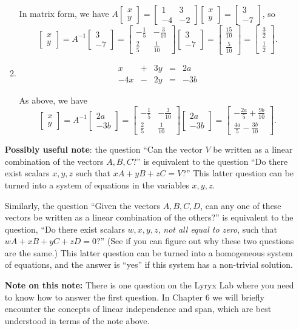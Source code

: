 \documentclass[12pt]{article}
\newcommand{\bbm}{\begin{bmatrix}}
\newcommand{\ebm}{\end{bmatrix}}
\begin{document}
\begin{enumerate}
\begin{enumerate}
In matrix form, we have $A\bbm x\\y\ebm = \bbm 1&3\\-4&-2\ebm\bbm x\\y\ebm = \bbm 3\\-7\ebm$, so
\[
 \bbm x\\y\ebm = A^{-1}\bbm 3\\-7\ebm = \bbm -\frac{1}{5}&-\frac{3}{10}\\\frac{2}{5}&\frac{1}{10}\ebm\bbm 3\\-7\ebm = \bbm \frac{15}{10}\\\frac{5}{10}\ebm = \bbm \frac{3}{2}\\\frac{1}{2}\ebm.
\]


\item \[
       \begin{array}{ccccc}
        x&+&3y&=&2a\\
       -4x&-&2y&=&-3b
       \end{array}
      \]

As above, we have
\[
 \bbm x\\y\ebm = A^{-1}\bbm 2a\\-3b\ebm = \bbm -\frac{1}{5}&-\frac{3}{10}\\\frac{2}{5}&\frac{1}{10}\ebm\bbm 2a\\-3b\ebm = \bbm -\frac{2a}{5}+\frac{9b}{10}\\\frac{4a}{5}-\frac{3b}{10}\ebm.
\]

\end{enumerate}

\textbf{Possibly useful note}: the question ``Can the vector $V$ be written as a linear combination of the vectors $A,B,C$?'' is equivalent to the question ``Do there exist scalars $x,y,z$ such that $xA+yB+zC=V$?'' This latter question can be turned into a system of equations in the variables $x,y,z$.

Similarly, the question ``Given the vectors $A,B,C,D$, can any one of these vectors be written as a linear combination of the others?'' is equivalent to the question, ``Do there exist scalars $w,x,y,z$, {\em not all equal to zero}, such that $wA+xB+yC+zD=0$?'' (See if you can figure out why these two questions are the same.) This latter question can be turned into a homogeneous system of equations, and the answer is ``yes'' if this system has a non-trivial solution.

\bigskip

\textbf{Note on this note:} There is one question on the Lyryx Lab where you need to know how to answer the first question. In Chapter 6 we will briefly encounter the concepts of linear independence and span, which are best understood in terms of the note above.

 \end{enumerate}
\end{document}
